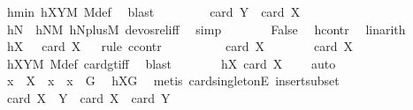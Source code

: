 \begin{isabellebody}
\ hmin\ hXYM\ M{\isacharunderscore}{\kern0pt}def\ \isamarkupfalse%
\ blast\isanewline
\ \ \ \ \isamarkupfalse%
\ \isamarkupfalse%
\ {\isachardoublequoteopen}{\isasymnot}\ card\ Y\ {\isacharless}{\kern0pt}\ card\ X{\isachardoublequoteclose}\ \isamarkupfalse%
\ hN\ \ hNM\ hNplusM\ devos{\isacharunderscore}{\kern0pt}rel{\isacharunderscore}{\kern0pt}iff\ \isamarkupfalse%
\ simp\isanewline
\ \ \ \ \isamarkupfalse%
\ \isamarkupfalse%
\ False\ \isamarkupfalse%
\ hcontr\ \isamarkupfalse%
\ linarith\isanewline
\ \ \isamarkupfalse%
\isanewline
\ \ \isamarkupfalse%
\ hX{}{\isacharcolon}{\kern0pt}\ {\isachardoublequoteopen}{}\ {\isasymle}\ card\ X{\isachardoublequoteclose}\isanewline
\ \ \isamarkupfalse%
{\isacharparenleft}{\kern0pt}rule\ ccontr{\isacharparenright}{\kern0pt}\isanewline
\ \ \ \ \isamarkupfalse%
\ {\isachardoublequoteopen}\ {\isasymnot}\ {}\ {\isasymle}\ card\ X{\isachardoublequoteclose}\isanewline
\ \ \ \ \isamarkupfalse%
\ \isamarkupfalse%
\ {\isachardoublequoteopen}card\ X\ {\isachargreater}{\kern0pt}\ {}{\isachardoublequoteclose}\ \isamarkupfalse%
\ hXYM\ M{\isacharunderscore}{\kern0pt}def\ card{\isacharunderscore}{\kern0pt}gt{\isacharunderscore}{\kern0pt}{}{\isacharunderscore}{\kern0pt}iff\ \isamarkupfalse%
\ blast\isanewline
\ \ \ \ \isamarkupfalse%
\ \isamarkupfalse%
\ hX{}{\isacharcolon}{\kern0pt}\ {\isachardoublequoteopen}card\ X\ {\isacharequal}{\kern0pt}\ {}{\isachardoublequoteclose}\ \isamarkupfalse%
\ auto\isanewline
\ \ \ \ \isamarkupfalse%
\ \isamarkupfalse%
\ x\ \ {\isachardoublequoteopen}X\ {\isacharequal}{\kern0pt}\ {\isacharbraceleft}{\kern0pt}x{\isacharbraceright}{\kern0pt}{\isachardoublequoteclose}\ \ {\isachardoublequoteopen}x\ {\isasymin}\ G{\isachardoublequoteclose}\ \isamarkupfalse%
\ hXG\ \isamarkupfalse%
\ {\isacharparenleft}{\kern0pt}metis\ card{\isacharunderscore}{\kern0pt}{}{\isacharunderscore}{\kern0pt}singletonE\ insert{\isacharunderscore}{\kern0pt}subset{\isacharparenright}{\kern0pt}\isanewline
\ \ \ \ \isamarkupfalse%
\ \isamarkupfalse%
\ {\isachardoublequoteopen}card\ {\isacharparenleft}{\kern0pt}X\ {\isasymcdots}\ Y{\isacharparenright}{\kern0pt}\ {\isacharequal}{\kern0pt}\ card\ X\ {\isacharplus}{\kern0pt}\ card\ Y\ {\isacharminus}{\kern0pt}\ {}{\isachardoublequoteclose}\ \isamarkupfalse%

\end{isabellebody}
